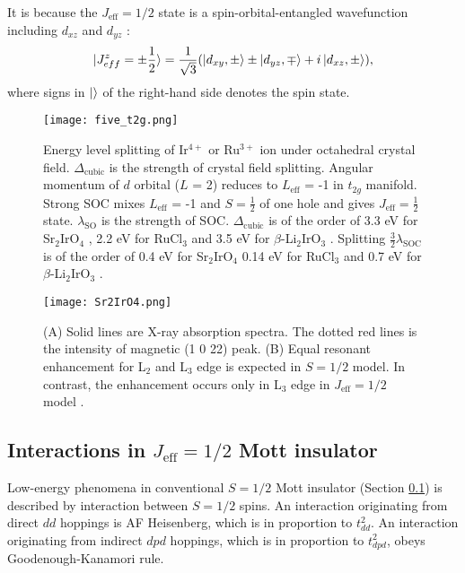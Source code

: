 It is because the $J_{\mathrm{eff}} = 1/2$ state is a spin-orbital-entangled wavefunction including $d_{xz}$ and $d_{yz}$ \cite{jackeli2009mott}:
\begin{align}
\ket{J^z_{eff} = \pm \frac{1}{2}} = \frac{1}{\sqrt{3}}(\ket{d_{xy}, \pm}\pm\ket{d_{yz}, \mp}+i\ket{d_{xz}, \pm}),
\label{Jeff}
\end{align}
where signs in $\ket{}$ of the right-hand side denotes the spin state.

\begin{figure}
  \centering
  \texttt{[image: five\_t2g.png]}
  \caption{Energy level splitting of Ir$^{4+}$ or Ru$^{3+}$ ion under octahedral crystal field.
  $\Delta_{\mathrm{cubic}}$ is the strength of crystal field splitting.
  Angular momentum of $d$ orbital ($L$ = 2) reduces to $L_{\mathrm{eff}}$ = -1 in $t_{2g}$ manifold.
  Strong SOC mixes $L_{\mathrm{eff}}$ = -1 and $S = \frac{1}{2}$ of one hole and gives $J_{\mathrm{eff}} = \frac{1}{2}$ state.
  $\lambda_{\mathrm{SO}}$ is the strength of SOC.
  $\Delta_{\mathrm{cubic}}$ is of the order of 3.3 eV for Sr$_2$IrO$_4$ \cite{ishii2011momentum}, 2.2 eV for RuCl$_3$ \cite{sandilands2016spin}
  and 3.5 eV for $\beta$-Li$_2$IrO$_3$ \cite{takayama2018pressure}.
  Splitting $\frac{3}{2}\lambda_{\mathrm{SOC}}$ is of the order of 0.4 eV for Sr$_2$IrO$_4$ \cite{kim2008novel} 0.14 eV for RuCl$_3$ \cite{sandilands2016spin}
  and 0.7 eV for $\beta$-Li$_2$IrO$_3$ \cite{takayama2018pressure}.}
  \label{five_t2g}
\end{figure}

\begin{figure}
  \centering
  \texttt{[image: Sr2IrO4.png]}
  \caption{(A) Solid lines are X-ray absorption spectra. The dotted red lines is the intensity of magnetic (1 0 22) peak.
  (B) Equal resonant enhancement for L$_2$ and L$_3$ edge is expected in $S = 1/2$ model. In contrast, the enhancement occurs only in L$_3$ edge in $J_\mathrm{eff} = 1/2$ model
  \cite{kim2009phase}.}
  \label{Sr2IrO4}
\end{figure}

\subsection{Interactions in $J_\mathrm{eff} = 1/2$ Mott insulator}
Low-energy phenomena in conventional $S = 1/2$ Mott insulator (Section \ref{}) is described by interaction between $S = 1/2$ spins.
An interaction originating from direct $dd$ hoppings is AF Heisenberg, which is in proportion to $t_{dd}^2$.
An interaction originating from indirect $dpd$ hoppings, which is in proportion to $t_{dpd}^2$, obeys Goodenough-Kanamori rule.

